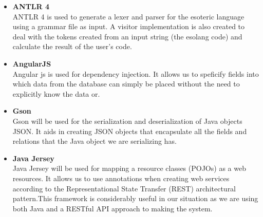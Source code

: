 \documentclass[english]{article}
\begin{document}
	\begin{itemize}
		
		
	\item \textbf{ANTLR 4} \\
	ANTLR 4 is used to generate a lexer and parser for the esoteric language using a grammar file as input. A visitor implementation is also created to deal with the tokens created from an input string (the esolang code) and calculate the result of the user's code.
	
	\item \textbf{AngularJS} \\ 
	Angular js is used for dependency injection. It allows us to speficify fields into which data from the database can simply be placed without the need to explicitly know the data or.
	
	\item \textbf{Gson}\\ Gson will be used for the serialization and deserialization of Java objects JSON. It aids in creating JSON objects that encapsulate all the fields and relations that the Java object we are serializing has.
	\item \textbf{Java Jersey} \\
	Java Jersey will be used for mapping a resource classes (POJOs) as a web resources. It allows us to use annotations  when creating web services according to the Representational State Transfer (REST) architectural pattern.This framework is considerably useful in our situation as we are using both Java and a RESTful API approach to making the system.
		\end{itemize}	

	
\end{document}
